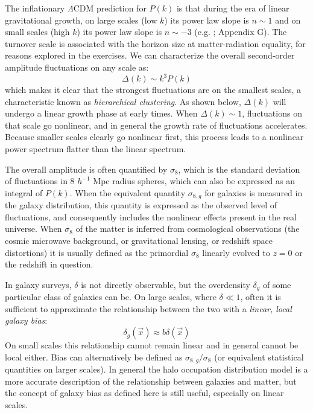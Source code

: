 The inflationary $\Lambda$CDM prediction for $P(k)$ is that during the
era of linear gravitational growth, on large scales (low $k$) its
power law slope is $n\sim 1$ and on small scales (high $k$) its power
law slope is $n\sim -3$ (e.g. \citealt{bardeen86a}; Appendix G). The
turnover scale is associated with the horizon size at matter-radiation
equality, for reasons explored in the exercises. We can characterize
the overall second-order amplitude fluctuations on any scale as:
\begin{equation}
\Delta(k) \sim k^3 P(k)
\end{equation}
which makes it clear that the strongest fluctuations are on the
smallest scales, a characteristic known as {\it hierarchical
clustering}. As shown below, $\Delta(k)$ will undergo a linear growth
phase at early times.  When $\Delta(k) \sim 1$, fluctuations on that
scale go nonlinear, and in general the growth rate of fluctuations
accelerates. Because smaller scales clearly go nonlinear first, this
process leads to a nonlinear power spectrum flatter than the linear
spectrum.

The overall amplitude is often quantified by $\sigma_8$, which is the
standard deviation of fluctuations in 8 $h^{-1}$ Mpc radius spheres,
which can also be expressed as an integral of $P(k)$. When the
equivalent quantity $\sigma_{8,g}$ for galaxies is measured in the
galaxy distribution, this quantity is expressed as the observed level
of fluctuations, and consequently includes the nonlinear effects
present in the real universe. When $\sigma_8$ of the matter is
inferred from cosmological observations (the cosmic microwave
background, or gravitational lensing, or redshift space distortions)
it is usually defined as the primordial $\sigma_8$ linearly evolved to
$z=0$ or the redshift in question.

In galaxy surveys, $\delta$ is not directly observable, but the
overdensity $\delta_g$ of some particular class of galaxies can be. On
large scales, where $\delta\ll 1$, often it is sufficient to
approximate the relationship between the two with a {\it linear, local
galaxy bias}:
\begin{equation}
\delta_g(\vec{x}) \approx b \delta(\vec{x})
\end{equation}
On small scales this relationship cannot remain linear and in general
cannot be local either. Bias can alternatively be defined as
$\sigma_{8,g} / \sigma_8$ (or equivalent statistical quantities on
larger scales). In general the halo occupation distribution model is a
more accurate description of the relationship between galaxies and
matter, but the concept of galaxy bias as defined here is still
useful, especially on linear scales.

